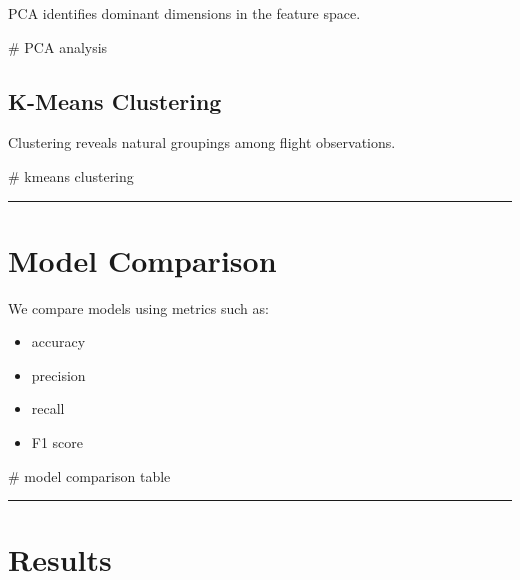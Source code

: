 \documentclass[
  letterpaper,
  DIV=11,
  numbers=noendperiod]{scrartcl}
\newenvironment{Shaded}{\begin{snugshade}}{\end{snugshade}}
\newcommand{\CommentTok}[1]{\textcolor[rgb]{0.37,0.37,0.37}{#1}}
\providecommand{\tightlist}{%
  \setlength{\itemsep}{0pt}\setlength{\parskip}{0pt}}
\begin{document}
PCA identifies dominant dimensions in the feature space.

\begin{Shaded}
\begin{Highlighting}[]
\CommentTok{\# PCA analysis}
\end{Highlighting}
\end{Shaded}

\subsection{K-Means Clustering}\label{k-means-clustering}

Clustering reveals natural groupings among flight observations.

\begin{Shaded}
\begin{Highlighting}[]
\CommentTok{\# kmeans clustering}
\end{Highlighting}
\end{Shaded}

\begin{center}\rule{0.5\linewidth}{0.5pt}\end{center}

\section{Model Comparison}\label{model-comparison}

We compare models using metrics such as:

\begin{itemize}
\tightlist
\item
  accuracy
\item
  precision
\item
  recall
\item
  F1 score
\end{itemize}

\begin{Shaded}
\begin{Highlighting}[]
\CommentTok{\# model comparison table}
\end{Highlighting}
\end{Shaded}

\begin{center}\rule{0.5\linewidth}{0.5pt}\end{center}

\section{Results}\label{results}
\end{document}
